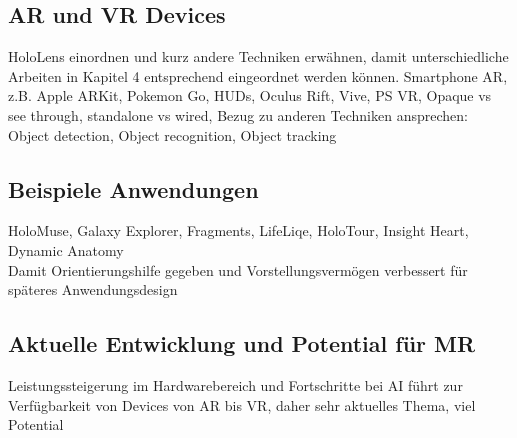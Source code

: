 \subsection{AR und VR Devices}
HoloLens einordnen und kurz andere Techniken erwähnen, damit unterschiedliche Arbeiten in Kapitel 4 entsprechend eingeordnet werden können. Smartphone AR, z.B. Apple ARKit, Pokemon Go, HUDs, Oculus Rift, Vive, PS VR, Opaque vs see through, standalone vs wired, Bezug zu anderen Techniken ansprechen: Object detection, Object recognition, Object tracking

\subsection{Beispiele Anwendungen}
HoloMuse, Galaxy Explorer, Fragments, LifeLiqe, HoloTour, Insight Heart, Dynamic Anatomy\\
Damit Orientierungshilfe gegeben und Vorstellungsvermögen verbessert für späteres Anwendungsdesign

\subsection{Aktuelle Entwicklung und Potential für MR}
Leistungssteigerung im Hardwarebereich und Fortschritte bei AI führt zur Verfügbarkeit von Devices von AR bis VR, daher sehr aktuelles Thema, viel Potential



